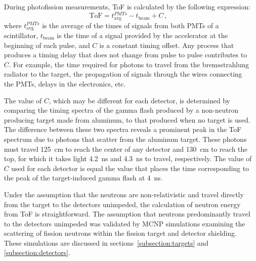 \documentclass[%
 reprint,
 amsmath,amssymb,
 aps,
 nofootinbib
]{revtex4-1}
\begin{document}
During photofission measurements, ToF is calculated by the following expression:
\begin{displaymath}
\text{ToF} = t^{PMTs}_{\text{avg}} - t_{\text{beam}} + C \, ,
\end{displaymath}
where $t^{PMTs}_{\text{avg}}$ is the average of the times of signals from both PMTs of a scintillator, $t_{\text{beam}}$ is the time of a signal provided by the accelerator at the beginning of each pulse, and $C$ is a constant timing offset.
Any process that produces a timing delay that does not change from pulse to pulse contributes to $C$.
For example, the time required for photons to travel from the bremsstrahlung radiator to the target, the propagation of signals through the wires connecting the PMTs, delays in the electronics, etc.

The value of $C$, which may be different for each detector, is determined by comparing the timing spectra of the gamma flash produced by a non-neutron producing target made from aluminum, to that produced when no target is used.
The difference between these two spectra reveals a prominent peak in the ToF spectrum due to photons that scatter from the aluminum target.
These photons must travel 125~cm to reach the center of any detector and 130~cm to reach the top, for which it takes light 4.2~ns and 4.3~ns to travel, respectively.
The value of $C$ used for each detector is equal the value that places the time corresponding to the peak of the target-induced gamma flash at 4~ns.

Under the assumption that the neutrons are non-relativistic and travel directly from the target to the detectors unimpeded, the calculation of neutron energy from ToF is straightforward.
The assumption that neutrons predominantly travel to the detectors unimpeded was validated by MCNP simulations examining the scattering of fission neutrons within the fission target and detector shielding. These simulations are discussed in sections~\ref{subsection:targets} and \ref{subsection:detectors}.

\end{document}
